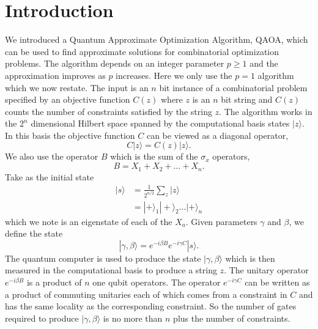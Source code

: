 \documentclass[t11pt,preprint,preprintnumbers]{revtex4}
\begin{document}
\section{Introduction}
We introduced \cite{farhi-2014} a Quantum Approximate Optimization Algorithm, QAOA, which can be used to find  approximate solutions for  combinatorial optimization problems. The algorithm depends on an integer parameter $p\geq1$ and the approximation improves as $p$ increases. Here we only use the $p=1$ algorithm which we now restate.  The input is an $n$ bit instance of a combinatorial problem specified by an objective function $C(z)$ where $z$ is an $n$ bit string and $C(z)$ counts the number of constraints satisfied by the string $z$.  The algorithm works in the $2^n$ dimensional Hilbert space spanned by the computational basis states  $| z \rangle$.  In this basis the objective function $C$ can be viewed as a diagonal operator,
\begin{equation}\label{eq1}
C | z \rangle = C(z) | z \rangle  .
\end{equation}
We also use the operator $B$ which is the sum of the $\sigma_x$ operators,
\begin{equation}\label{eq2}
B = X_1 + X_2 + \ldots + X_n .
\end{equation}
Take as the initial state 
\begin{equation}\label{eq3}
\begin{split}
| s \rangle &= \frac{1}{2^{n/2}} \sum_{z}   | z \rangle \\
&= | + \rangle_1 | + \rangle_2 ... | + \rangle_n
\end{split}
\end{equation}
\noindent which we note is an eigenstate of each of the $X_a$.  Given parameters $\gamma$ and $\beta$, we define the state
\begin{equation}\label{eq4}
|\gamma, \beta \rangle = e^{-i \beta B}e^{-i \gamma C}  | s \rangle.
\end{equation}
The quantum computer is used to produce the state $|\gamma, \beta \rangle$  which is then measured in the computational basis to produce a string $z$.  The unitary operator $e^{-i \beta B}$ is a product of $n$ one qubit operators.  The operator $e^{-i \gamma C}$ can be written as a product of commuting unitaries each of which comes from a constraint in $C$ and has the same locality as the corresponding constraint.  So the number of gates required to produce $|\gamma, \beta\rangle$  is no more than $n$ plus the number of constraints. 
\end{document}
